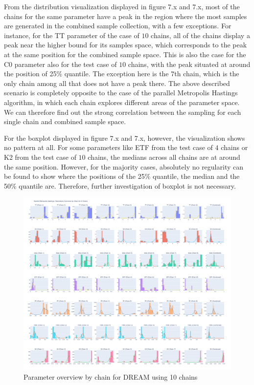 From the distribution visualization displayed in figure 7.x and 7.x, most of the chains for the same parameter have a peak in the region where the most samples are generated in the combined sample collection, with a few exceptions. For instance, for the TT parameter of the case of $10$ chains, all of the chains display a peak near the higher bound for its samples space, which corresponds to the peak at the same position for the combined sample space. This is also the case for the C0 parameter also for the test case of $10$ chains, with the peak situated at around the position of 25\% quantile. The exception here is the $7$th chain, which is the only chain among all that does not have a peak there. The above described scenario is completely opposite to the case of the parallel Metropolis Hastings algorithm, in which each chain explores different areas of the parameter space. We can therefore find out the strong correlation between the sampling for each single chain and combined sample space.

For the boxplot displayed in figure 7.x and 7.x, however, the visualization shows no pattern at all. For some parameters like ETF from the test case of $4$ chains or K2 from the test case of $10$ chains, the medians across all chains are at around the same position. However, for the majority cases, absolutely no regularity can be found to show where the positions of the 25\% quantile, the median and the 50\% quantile are. Therefore, further investigation of boxplot is not necessary.

\begin{figure}[H]
    \centering
    \includegraphics[width=1\textwidth]{figures/dream/param_overview_10.png}
    \captionsetup{width=.8\textwidth}
    \caption{Parameter overview by chain for DREAM using 10 chains}
    \label{fig:enter-label}
\end{figure}

